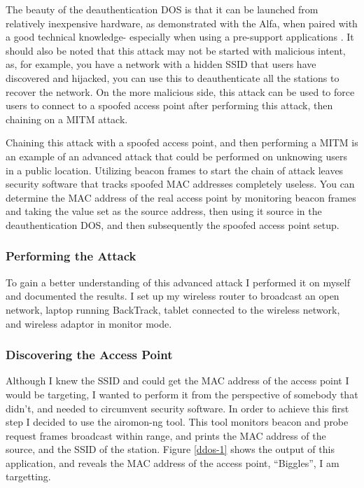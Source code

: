 The beauty of the deauthentication DOS is that it can be launched from relatively inexpensive hardware, as demonstrated with the Alfa, when paired with a good technical knowledge- especially when using a pre-support applications \cite{research:aircrack}. It should also be noted that this attack may not be started with malicious intent, as, for example, you have a network with a hidden SSID that users have discovered and hijacked, you can use this to deauthenticate all the stations to recover the network. On the more malicious side, this attack can be used to force users to connect to a spoofed access point after performing this attack, then chaining on a MITM attack. 

Chaining this attack with a spoofed access point, and then performing a MITM is an example of an advanced attack that could be performed on unknowing users in a public location. Utilizing beacon frames to start the chain of attack leaves security software that tracks spoofed MAC addresses completely useless. You can determine the MAC address of the real access point by monitoring beacon frames and taking the value set as the source address, then using it source in the deauthentication DOS, and then subsequently the spoofed access point setup.

\subsubsection*{Performing the Attack}
To gain a better understanding of this advanced attack I performed it on myself and documented the results. I set up my wireless router to broadcast an open network, laptop running BackTrack, tablet connected to the wireless network, and wireless adaptor in monitor mode.

\subsubsection*{Discovering the Access Point}
Although I knew the SSID and could get the MAC address of the access point I would be targeting, I wanted to perform it from the perspective of somebody that didn't, and needed to circumvent security software. In order to achieve this first step I decided to use the airomon-ng tool. This tool monitors beacon and probe request frames broadcast within range, and prints the MAC address of the source, and the SSID of the station. Figure \ref{ddos-1} shows the output of this application, and reveals the MAC address of the access point, ``Biggles'', I am targetting.

